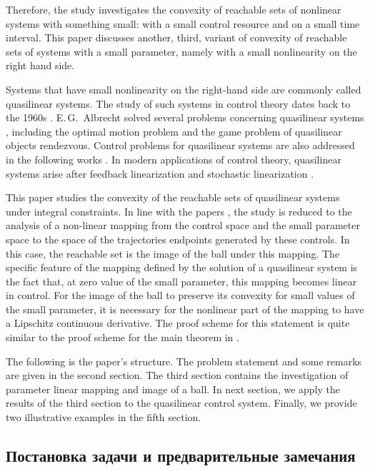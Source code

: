 \documentclass[../main.tex]{subfiles}
\begin{document}
Therefore, the study investigates the convexity of reachable sets of nonlinear systems with something small: with a small control resource and on a small time interval. This paper discusses another, third, variant of convexity of reachable sets of systems with a small parameter, namely with a small nonlinearity on the right hand side.

Systems that have small nonlinearity on the right-hand side are commonly called quasilinear systems.
The study of such systems in control theory dates back to the 1960s \cite{Subbotin, Kiselev, Kras_book}.
E.\,G.~Albrecht solved several problems concerning quasilinear systems \cite{Albrecht3}, including the optimal motion problem \cite{Albrecht1} and the game problem of quasilinear objects rendezvous\cite{Albrecht2}.
Control problems for quasilinear systems are also addressed in the following works \cite{Dauer, Kremlev, KalininLavrinovich2018, Gabasov}.
In modern applications of control theory, quasilinear systems arise after feedback linearization \cite{Calvet} and
stochastic linearization \cite{Ching, Gui}.

This paper studies the convexity of the reachable sets of quasilinear systems under integral constraints. 
In line with the papers \cite{Polyak2001, Polyak2004, GusOsSteklov, GusevUMJ, Osipov, GusOsUdmurt}, the study is reduced to the analysis of a non-linear mapping from the  control space and the small parameter space to the space of the trajectories endpoints generated by these controls.
In this case, the reachable set is the image of the ball under this mapping. 
The specific feature of the mapping defined by the solution of a quasilinear system is the fact that, at zero value of the small parameter, this mapping becomes linear in control.
For the image of the ball to preserve its convexity for small values of the small parameter, it is necessary for the nonlinear part of the mapping to have a Lipschitz  continuous derivative. 
The proof scheme for this statement is quite similar to the proof scheme for the main theorem in \cite{Polyak2001}.

The following is the paper's structure. The problem statement and some remarks are given in the second section. The third section contains the investigation of parameter linear mapping and image of a ball. In next section, we apply the results of the third section to the quasilinear control system. Finally, we provide two illustrative examples in the fifth section.

\subsection{Постановка задачи и предварительные замечания}
\end{document}
